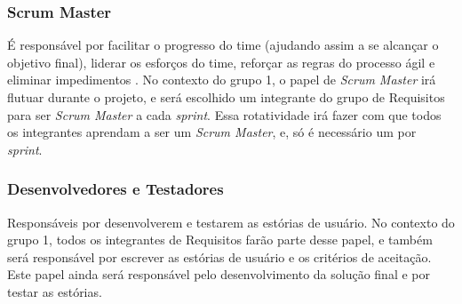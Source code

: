 \subsubsection{Scrum Master}
É responsável por facilitar o progresso do time (ajudando assim a se alcançar o objetivo final), liderar os esforços do time, reforçar as regras do processo ágil e eliminar impedimentos \cite[p. 47-48]{safe001}. No contexto do grupo 1, o papel de \emph{Scrum Master} irá flutuar durante o projeto, e será escolhido um integrante do grupo de Requisitos para ser \emph{Scrum Master} a cada \emph{sprint}. Essa rotatividade irá fazer com que todos os integrantes aprendam a ser um \emph{Scrum Master}, e, só é necessário um por \emph{sprint}.

\subsubsection{Desenvolvedores e Testadores}
Responsáveis por desenvolverem e testarem as estórias de usuário. No contexto do grupo 1, todos os integrantes de Requisitos farão parte desse papel, e também será responsável por escrever as estórias de usuário e os critérios de aceitação. Este papel ainda será responsável pelo desenvolvimento da solução final e por testar as estórias.